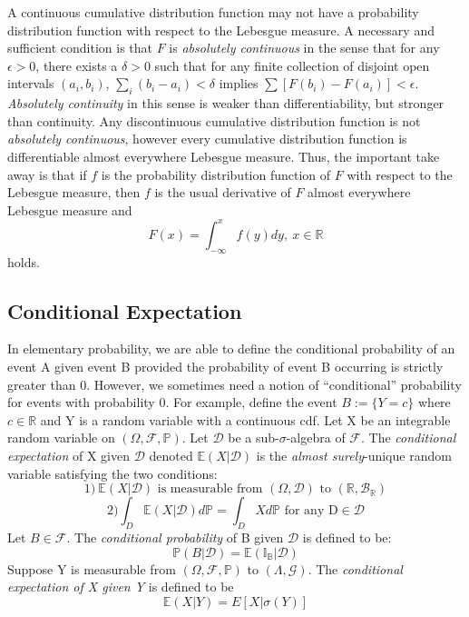 \documentclass{article}
\begin{document}
A continuous cumulative distribution function may not have a probability distribution function with respect to the Lebesgue measure. A necessary and sufficient condition is that $F$ is \emph{absolutely continuous} in the sense that for any $\epsilon >0$, there exists a $\delta>0$ such that for any finite collection of disjoint open intervals $(a_i,b_i)$, $\sum_i(b_i-a_i)<\delta$ implies $\sum[F(b_i)-F(a_i)] <\epsilon$. \emph{Absolutely continuity} in this sense is weaker than differentiability, but stronger than continuity.\newline \newline
 Any discontinuous cumulative distribution function is not \emph{absolutely continuous}, however every cumulative distribution function is differentiable almost everywhere Lebesgue measure. Thus, the important take away is that if $f$ is the probability distribution function of $F$ with respect to the Lebesgue measure, then $f$ is the usual derivative of $F$ almost everywhere Lebesgue measure and 
\[
F(x)=\int_{-\infty}^xf(y)dy, \ x  \in \mathbb{R}
\]
holds.
\subsection{Conditional Expectation}
In elementary probability, we are able to define the conditional probability of an event A given event B provided the probability of event B occurring is strictly greater than 0. However, we sometimes need a notion of ``conditional'' probability for events with probability 0. For example, define the event $B:=\{Y=c\}$ where $c\in \mathbb{R}$ and Y is a random variable with a continuous cdf.\newline \newline
Let X be an integrable random variable on $(\Omega,\mathcal{F},\mathbb{P})$. Let $\mathcal{D}$ be a sub-$\sigma$-algebra of $\mathcal{F}$. The \emph{conditional expectation} of X given $\mathcal{D}$ denoted $\mathbb{E}(X|\mathcal{D})$ is the \emph{almost surely}-unique random variable satisfying the two conditions:
\[
1) \ \mathbb{E}(X|\mathcal{D}) \text{ is measurable from } (\Omega,\mathcal{D}) \text{ to } (\mathbb{R},\mathcal{B}_{\mathbb{R}})
\]
\[
2) \int_D\mathbb{E}(X|\mathcal{D})d\mathbb{P}=\int_DXd\mathbb{P} \text{ for any D}\in\mathcal{D}
\]
Let $B\in \mathcal{F}$. The \emph{conditional probability} of B given $\mathcal{D}$ is defined to be:
\[
\mathbb{P}(B|\mathcal{D})= \mathbb{E}(\mathbb{I_B|\mathcal{D}})
\]
Suppose Y is measurable from $(\Omega,\mathcal{F},\mathbb{P})$ to  $(\Lambda,\mathcal{G})$. The \emph{conditional expectation of X given Y} is defined to be
\[
\mathbb{E}(X|Y)=E[X|\sigma(Y)]
\]
\end{document}
